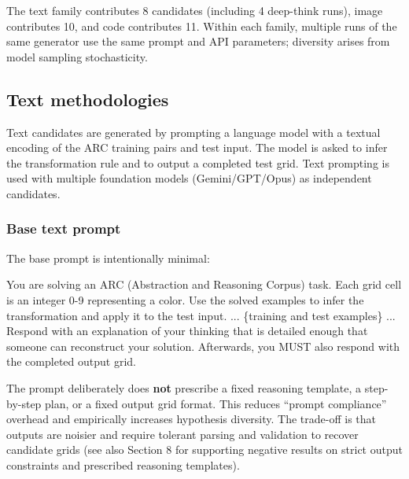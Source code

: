 \documentclass[11pt]{article}
\newenvironment{Shaded}{}{}
\newcommand{\NormalTok}[1]{#1}
\renewenvironment{Shaded}{\begin{snugshade}}{\end{snugshade}}
\begin{document}
The text family contributes 8 candidates (including 4 deep-think runs),
image contributes 10, and code contributes 11. Within each family,
multiple runs of the same generator use the same prompt and API
parameters; diversity arises from model sampling stochasticity.

\hypertarget{text-methodologies}{%
\subsection{Text methodologies}\label{text-methodologies}}

Text candidates are generated by prompting a language model with a
textual encoding of the ARC training pairs and test input. The model is
asked to infer the transformation rule and to output a completed test
grid. Text prompting is used with multiple foundation models
(Gemini/GPT/Opus) as independent candidates.

\hypertarget{base-text-prompt}{%
\subsubsection{Base text prompt}\label{base-text-prompt}}

The base prompt is intentionally minimal:

\begin{Shaded}
\begin{Highlighting}[]
\NormalTok{You are solving an ARC (Abstraction and Reasoning Corpus)}
\NormalTok{task. Each grid cell is an integer 0{-}9 representing a color.}
\NormalTok{Use the solved examples to infer the transformation and}
\NormalTok{apply it to the test input.}
\NormalTok{...}
\NormalTok{\{training and test examples\}}
\NormalTok{...}
\NormalTok{Respond with an explanation of your thinking that is detailed}
\NormalTok{enough that someone can reconstruct your solution. Afterwards,}
\NormalTok{you MUST also respond with the completed output grid.}
\end{Highlighting}
\end{Shaded}

The prompt deliberately does \textbf{not} prescribe a fixed reasoning
template, a step-by-step plan, or a fixed output grid format. This
reduces ``prompt compliance'' overhead and empirically increases
hypothesis diversity. The trade-off is that outputs are noisier and
require tolerant parsing and validation to recover candidate grids (see
also Section 8 for supporting negative results on strict output
constraints and prescribed reasoning templates).
\end{document}
